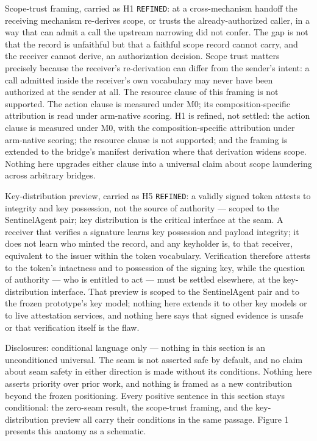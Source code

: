 \documentclass[
  10pt,
]{article}
\let\origtexttt\texttt
\renewcommand{\texttt}[1]{{\upshape\origtexttt{#1}}}
\renewcommand{\_}{\origunderscore\allowbreak}
\begin{document}
Scope-trust framing, carried as H1 \texttt{REFINED}: at a
cross-mechanism handoff the receiving mechanism re-derives scope, or
trusts the already-authorized caller, in a way that can admit a call the
upstream narrowing did not confer. The gap is not that the record is
unfaithful but that a faithful scope record cannot carry, and the
receiver cannot derive, an authorization decision. Scope trust matters
precisely because the receiver's re-derivation can differ from the
sender's intent: a call admitted inside the receiver's own vocabulary
may never have been authorized at the sender at all. The resource clause
of this framing is not supported. The action clause is measured under
M0; its composition-specific attribution is read under arm-native
scoring. H1 is refined, not settled: the action clause is measured under
M0, with the composition-specific attribution under arm-native scoring;
the resource clause is not supported; and the framing is extended to the
bridge's manifest derivation where that derivation widens scope. Nothing
here upgrades either clause into a universal claim about scope
laundering across arbitrary bridges.

Key-distribution preview, carried as H5 \texttt{REFINED}: a validly
signed token attests to integrity and key possession, not the source of
authority --- scoped to the SentinelAgent pair; key distribution is the
critical interface at the seam. A receiver that verifies a signature
learns key possession and payload integrity; it does not learn who
minted the record, and any keyholder is, to that receiver, equivalent to
the issuer within the token vocabulary. Verification therefore attests
to the token's intactness and to possession of the signing key, while
the question of authority --- who is entitled to act --- must be settled
elsewhere, at the key-distribution interface. That preview is scoped to
the SentinelAgent pair and to the frozen prototype's key model; nothing
here extends it to other key models or to live attestation services, and
nothing here says that signed evidence is unsafe or that verification
itself is the flaw.

Disclosures: conditional language only --- nothing in this section is an
unconditioned universal. The seam is not asserted safe by default, and
no claim about seam safety in either direction is made without its
conditions. Nothing here asserts priority over prior work, and nothing
is framed as a new contribution beyond the frozen positioning. Every
positive sentence in this section stays conditional: the zero-seam
result, the scope-trust framing, and the key-distribution preview all
carry their conditions in the same passage. Figure 1 presents this
anatomy as a schematic.
\end{document}
